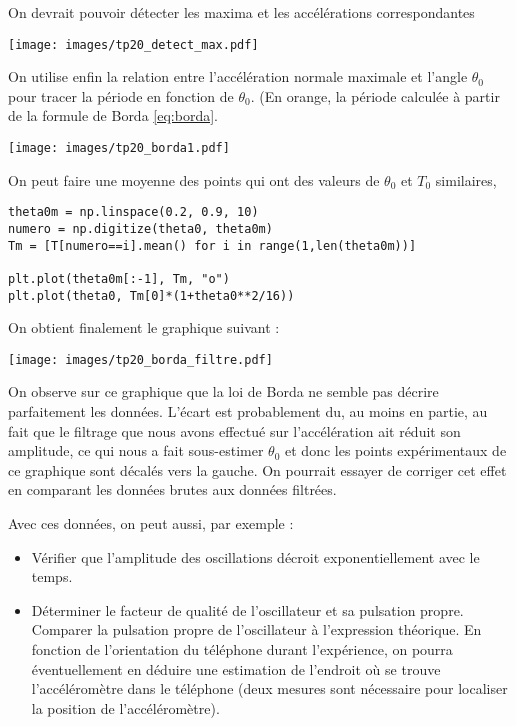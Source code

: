\documentclass[a4paper]{tp}
\begin{document}
On devrait pouvoir détecter les maxima et les accélérations correspondantes

\begin{center}
  \texttt{[image: images/tp20\_detect\_max.pdf]}
\end{center}

On utilise enfin la relation entre l'accélération normale maximale et l'angle $\theta_0$ pour tracer la période en fonction de $\theta_0$. (En orange, la période calculée à partir de la formule de Borda \eqref{eq:borda}. 

    \begin{center}
      \texttt{[image: images/tp20\_borda1.pdf]}
    \end{center}


  On peut faire une moyenne des points qui ont des valeurs de $\theta_0$ et $T_0$ similaires, 

\begin{verbatim}
theta0m = np.linspace(0.2, 0.9, 10)
numero = np.digitize(theta0, theta0m)
Tm = [T[numero==i].mean() for i in range(1,len(theta0m))]

plt.plot(theta0m[:-1], Tm, "o")
plt.plot(theta0, Tm[0]*(1+theta0**2/16))
\end{verbatim}

On obtient finalement le graphique suivant :
    \begin{center}
      \texttt{[image: images/tp20\_borda\_filtre.pdf]}
    \end{center}

    On observe sur ce graphique que la loi de Borda ne semble pas décrire parfaitement les données. L'écart est probablement du, au moins en partie, au fait que le filtrage que nous avons effectué sur l'accélération ait réduit son amplitude, ce qui nous a fait sous-estimer $\theta_0$ et donc les points expérimentaux de ce graphique sont décalés vers la gauche. On pourrait essayer de corriger cet effet en comparant les données brutes aux données filtrées.

    Avec ces données, on peut aussi, par exemple :
    \begin{itemize}
  \item Vérifier que l'amplitude des oscillations décroit exponentiellement avec le temps.

  \item Déterminer le facteur de qualité de l'oscillateur et sa pulsation propre. Comparer la pulsation propre de l'oscillateur à l'expression théorique. En fonction de l'orientation du téléphone durant l'expérience, on pourra éventuellement en déduire une estimation de l'endroit où se trouve l'accéléromètre dans le téléphone (deux mesures sont nécessaire pour localiser la position de l'accéléromètre).
\end{itemize}
\end{document}
